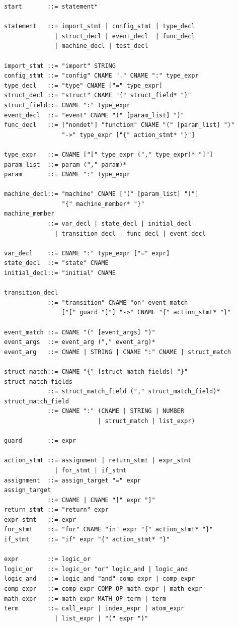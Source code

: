 \documentclass[11pt,letterpaper]{article}
\begin{document}
\begin{lstlisting}[numbers=none,basicstyle=\ttfamily\footnotesize]
start       ::= statement*

statement   ::= import_stmt | config_stmt | type_decl
              | struct_decl | event_decl  | func_decl
              | machine_decl | test_decl

import_stmt ::= "import" STRING
config_stmt ::= "config" CNAME "." CNAME ":" type_expr
type_decl   ::= "type" CNAME ["=" type_expr]
struct_decl ::= "struct" CNAME "{" struct_field* "}"
struct_field::= CNAME ":" type_expr
event_decl  ::= "event" CNAME "(" [param_list] ")"
func_decl   ::= ["nondet"] "function" CNAME "(" [param_list] ")"
                "->" type_expr ["{" action_stmt* "}"]

type_expr   ::= CNAME ["[" type_expr ("," type_expr)* "]"]
param_list  ::= param ("," param)*
param       ::= CNAME ":" type_expr

machine_decl::= "machine" CNAME ["(" [param_list] ")"]
                "{" machine_member* "}"
machine_member
            ::= var_decl | state_decl | initial_decl
              | transition_decl | func_decl | event_decl

var_decl    ::= CNAME ":" type_expr ["=" expr]
state_decl  ::= "state" CNAME
initial_decl::= "initial" CNAME

transition_decl
            ::= "transition" CNAME "on" event_match
                ["[" guard "]"] "->" CNAME "{" action_stmt* "}"

event_match ::= CNAME "(" [event_args] ")"
event_args  ::= event_arg ("," event_arg)*
event_arg   ::= CNAME | STRING | CNAME ":" CNAME | struct_match

struct_match::= CNAME "{" [struct_match_fields] "}"
struct_match_fields
            ::= struct_match_field ("," struct_match_field)*
struct_match_field
            ::= CNAME ":" (CNAME | STRING | NUMBER
                          | struct_match | list_expr)

guard       ::= expr

action_stmt ::= assignment | return_stmt | expr_stmt
              | for_stmt | if_stmt
assignment  ::= assign_target "=" expr
assign_target
            ::= CNAME | CNAME "[" expr "]"
return_stmt ::= "return" expr
expr_stmt   ::= expr
for_stmt    ::= "for" CNAME "in" expr "{" action_stmt* "}"
if_stmt     ::= "if" expr "{" action_stmt* "}"

expr        ::= logic_or
logic_or    ::= logic_or "or" logic_and | logic_and
logic_and   ::= logic_and "and" comp_expr | comp_expr
comp_expr   ::= comp_expr COMP_OP math_expr | math_expr
math_expr   ::= math_expr MATH_OP term | term
term        ::= call_expr | index_expr | atom_expr
              | list_expr | "(" expr ")"


\end{lstlisting}
\end{document}
